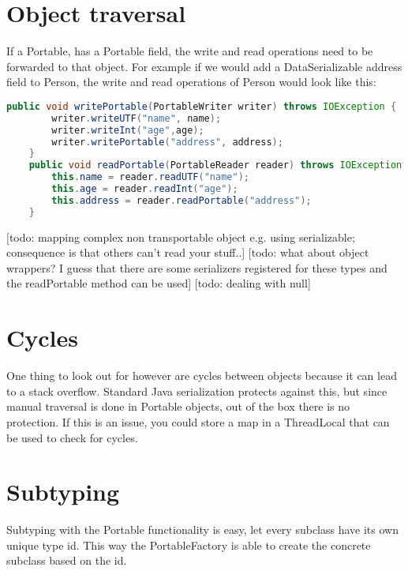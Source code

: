 \section{Object traversal}
If a Portable, has a Portable field, the write and read operations need to be forwarded to that object. For example if we would add a DataSerializable address field to Person, the write and read operations of Person would look like this:
\begin{lstlisting}[language=java]
    public void writePortable(PortableWriter writer) throws IOException {
        writer.writeUTF("name", name);
        writer.writeInt("age",age);
        writer.writePortable("address", address);
    }
    public void readPortable(PortableReader reader) throws IOException {
        this.name = reader.readUTF("name");
        this.age = reader.readInt("age");
        this.address = reader.readPortable("address");
    }
\end{lstlisting}
[todo: mapping complex non transportable object e.g. using serializable; consequence is that others can't read your stuff..]
[todo: what about object wrappers? I guess that there are some serializers registered for these types and the readPortable method can be used]
[todo: dealing with null]

\section{Cycles}
One thing to look out for however are cycles between objects because it can lead to a stack overflow. Standard Java serialization protects against this, but since manual traversal is done in Portable objects, out of the box there is no protection. If this is an issue, you could store a map in a ThreadLocal that can be used to check for cycles.

\section{Subtyping}
Subtyping with the Portable functionality is easy, let every subclass have its own unique type id. This way the PortableFactory is able to create the concrete subclass based on the id. 

